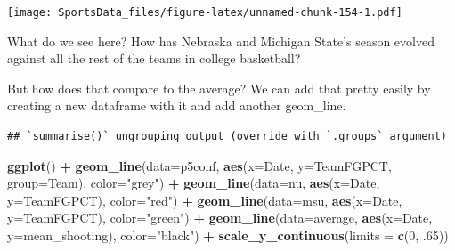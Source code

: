 \documentclass[
]{book}
\newenvironment{Shaded}{\begin{snugshade}}{\end{snugshade}}
\newcommand{\DataTypeTok}[1]{\textcolor[rgb]{0.13,0.29,0.53}{#1}}
\newcommand{\DecValTok}[1]{\textcolor[rgb]{0.00,0.00,0.81}{#1}}
\newcommand{\FloatTok}[1]{\textcolor[rgb]{0.00,0.00,0.81}{#1}}
\newcommand{\KeywordTok}[1]{\textcolor[rgb]{0.13,0.29,0.53}{\textbf{#1}}}
\newcommand{\NormalTok}[1]{#1}
\newcommand{\OperatorTok}[1]{\textcolor[rgb]{0.81,0.36,0.00}{\textbf{#1}}}
\newcommand{\StringTok}[1]{\textcolor[rgb]{0.31,0.60,0.02}{#1}}
\begin{document}
\texttt{[image: SportsData\_files/figure-latex/unnamed-chunk-154-1.pdf]}

What do we see here? How has Nebraska and Michigan State's season evolved against all the rest of the teams in college basketball?

But how does that compare to the average? We can add that pretty easily by creating a new dataframe with it and add another geom\_line.

\begin{Shaded}
\end{Shaded}

\begin{verbatim}
## `summarise()` ungrouping output (override with `.groups` argument)
\end{verbatim}

\begin{Shaded}
\begin{Highlighting}[]
\KeywordTok{ggplot}\NormalTok{() }\OperatorTok{+}\StringTok{ }\KeywordTok{geom_line}\NormalTok{(}\DataTypeTok{data=}\NormalTok{p5conf, }\KeywordTok{aes}\NormalTok{(}\DataTypeTok{x=}\NormalTok{Date, }\DataTypeTok{y=}\NormalTok{TeamFGPCT, }\DataTypeTok{group=}\NormalTok{Team), }\DataTypeTok{color=}\StringTok{"grey"}\NormalTok{) }\OperatorTok{+}\StringTok{ }\KeywordTok{geom_line}\NormalTok{(}\DataTypeTok{data=}\NormalTok{nu, }\KeywordTok{aes}\NormalTok{(}\DataTypeTok{x=}\NormalTok{Date, }\DataTypeTok{y=}\NormalTok{TeamFGPCT), }\DataTypeTok{color=}\StringTok{"red"}\NormalTok{) }\OperatorTok{+}\StringTok{ }\KeywordTok{geom_line}\NormalTok{(}\DataTypeTok{data=}\NormalTok{msu, }\KeywordTok{aes}\NormalTok{(}\DataTypeTok{x=}\NormalTok{Date, }\DataTypeTok{y=}\NormalTok{TeamFGPCT), }\DataTypeTok{color=}\StringTok{"green"}\NormalTok{) }\OperatorTok{+}\StringTok{ }\KeywordTok{geom_line}\NormalTok{(}\DataTypeTok{data=}\NormalTok{average, }\KeywordTok{aes}\NormalTok{(}\DataTypeTok{x=}\NormalTok{Date, }\DataTypeTok{y=}\NormalTok{mean_shooting), }\DataTypeTok{color=}\StringTok{"black"}\NormalTok{) }\OperatorTok{+}\StringTok{ }\KeywordTok{scale_y_continuous}\NormalTok{(}\DataTypeTok{limits =} \KeywordTok{c}\NormalTok{(}\DecValTok{0}\NormalTok{, }\FloatTok{.65}\NormalTok{))}
\end{Highlighting}
\end{Shaded}
\end{document}
